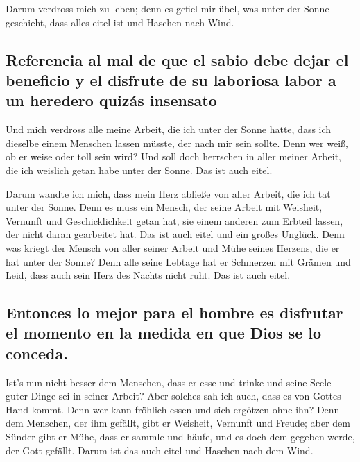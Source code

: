  Darum verdross mich zu leben; denn es gefiel mir übel,
was unter der Sonne geschieht, dass alles eitel ist und Haschen nach
Wind.

\hypertarget{referencia-al-mal-de-que-el-sabio-debe-dejar-el-beneficio-y-el-disfrute-de-su-laboriosa-labor-a-un-heredero-quizuxe1s-insensato}{%
\subsection{Referencia al mal de que el sabio debe dejar el beneficio y
el disfrute de su laboriosa labor a un heredero quizás
insensato}\label{referencia-al-mal-de-que-el-sabio-debe-dejar-el-beneficio-y-el-disfrute-de-su-laboriosa-labor-a-un-heredero-quizuxe1s-insensato}}

 Und mich verdross alle meine Arbeit, die ich unter der
Sonne hatte, dass ich dieselbe einem Menschen lassen müsste, der nach
mir sein sollte.  Denn wer weiß, ob er weise oder toll
sein wird? Und soll doch herrschen in aller meiner Arbeit, die ich
weislich getan habe unter der Sonne. Das ist auch eitel.

 Darum wandte ich mich, dass mein Herz abließe von aller
Arbeit, die ich tat unter der Sonne.  Denn es muss ein
Mensch, der seine Arbeit mit Weisheit, Vernunft und Geschicklichkeit
getan hat, sie einem anderen zum Erbteil lassen, der nicht daran
gearbeitet hat. Das ist auch eitel und ein großes Unglück.
 Denn was kriegt der Mensch von aller seiner Arbeit und
Mühe seines Herzens, die er hat unter der Sonne?  Denn
alle seine Lebtage hat er Schmerzen mit Grämen und Leid, dass auch sein
Herz des Nachts nicht ruht. Das ist auch eitel.

\hypertarget{entonces-lo-mejor-para-el-hombre-es-disfrutar-el-momento-en-la-medida-en-que-dios-se-lo-conceda.}{%
\subsection{Entonces lo mejor para el hombre es disfrutar el momento en
la medida en que Dios se lo
conceda.}\label{entonces-lo-mejor-para-el-hombre-es-disfrutar-el-momento-en-la-medida-en-que-dios-se-lo-conceda.}}

 Ist's nun nicht besser dem Menschen, dass er esse und
trinke und seine Seele guter Dinge sei in seiner Arbeit? Aber solches
sah ich auch, dass es von Gottes Hand kommt.  Denn wer
kann fröhlich essen und sich ergötzen ohne ihn?  Denn dem
Menschen, der ihm gefällt, gibt er Weisheit, Vernunft und Freude; aber
dem Sünder gibt er Mühe, dass er sammle und häufe, und es doch dem
gegeben werde, der Gott gefällt. Darum ist das auch eitel und Haschen
nach dem Wind.

